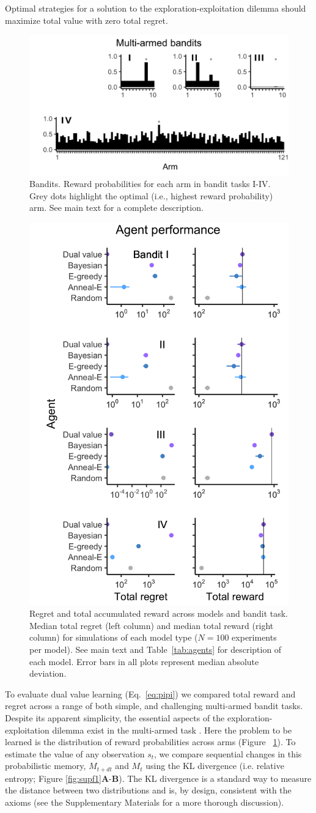 \documentclass[12pt]{article}
\begin{document}
Optimal strategies for a solution to the exploration-exploitation dilemma should maximize total value with zero total regret. 

\begin{figure}
	[tbhp] \centering 
	\includegraphics[width=.6\linewidth]{figures/fig2.png} 
	\caption{ \label{fig:f2} Bandits. Reward probabilities for each arm in bandit tasks I-IV. Grey dots highlight the optimal (i.e., highest reward probability) arm. See main text for a complete description.} 
\end{figure}

\begin{figure}
	[tbhp] \centering 
	\includegraphics[width=.45\linewidth]{figures/fig3.png} 
	\caption{ \label{fig:f3} Regret and total accumulated reward across models and bandit task. Median total regret (left column) and median total reward (right column) for simulations of each model type ($N=100$ experiments per model). See main text and Table~\ref{tab:agents} for description of each model. Error bars in all plots represent median absolute deviation.} 
\end{figure}

To evaluate dual value learning (Eq.~\ref{eq:pipi}) we compared total reward and regret across a range of both simple, and challenging multi-armed bandit tasks. Despite its apparent simplicity, the essential aspects of the exploration-exploitation dilemma exist in the multi-armed task \cite{Sutton2018}. Here the problem to be learned is the distribution of reward probabilities across arms (Figure ~\ref{fig:f2}).  To estimate the value of any observation $s_t$, we compare sequential changes in this probabilistic memory, $M_{t+dt}$ and $M_t$ using the KL divergence (i.e. relative entropy; Figure \ref{fig:supf1}\textbf{A}-\textbf{B}). The KL divergence is a standard way to measure the distance between two distributions \cite{MacKay2003} and is, by design, consistent with the axioms (see the Supplementary Materials for a more thorough discussion). 
\end{document}
